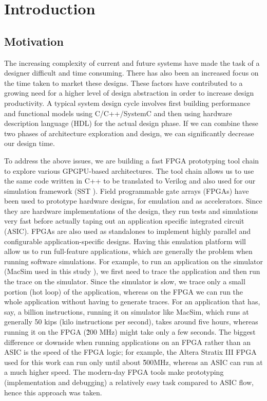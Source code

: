 \setcounter{equation}{0}

\chapter{Introduction}
\label{chap:introduction}

\section{Motivation}
The increasing complexity of current and future systems have made the task of a designer difficult and time consuming. There has also been an increased focus on the time taken to market these designs. These factors have contributed to a growing need for a higher level of design abstraction in order to increase design productivity. A typical system design cycle involves first building performance and functional models using C/C++/SystemC and then using hardware description language (HDL) for the actual design phase. If we can combine these two phases of architecture exploration and design, we can significantly decrease our design time.

To address the above issues, we are building a fast FPGA prototyping tool chain to explore various GPGPU-based architectures. The tool chain allows us to use the same code written in C++ to be translated to Verilog and also used for our simulation framework (SST \cite{SST}).
Field programmable gate arrays (FPGAs) have been used to prototype hardware designs, for emulation and as accelerators. Since they are hardware implementations of the design, they run tests and simulations very fast before actually taping out an application specific integrated circuit (ASIC). FPGAs are also used as standalones to implement highly parallel and configurable application-specific designs. Having this emulation platform will allow us to run full-feature applications, which are generally the problem when running software simulations. For example, to run an application on the simulator (MacSim used in this study \cite{macsim}), we first need to trace the application and then run the trace on the simulator. Since the simulator is slow, we trace only a small portion (hot loop) of the application, whereas on the FPGA we can run the whole application without having to generate traces. For an application that has, say, a billion instructions, running it on simulator like MacSim, which runs at generally 50 kips (kilo instructions per second), takes around five hours, whereas running it on the FPGA (\~ 200 MHz) might take only a few seconds. The biggest difference or downside when running applications on an FPGA rather than an ASIC is the speed of the FPGA logic; for example, the Altera Stratix III FPGA used for this work can run only until about \~500MHz, whereas an ASIC can run at a much higher speed. The modern-day FPGA tools make prototyping (implementation and debugging) a relatively easy task compared to ASIC flow, hence this approach was taken.

